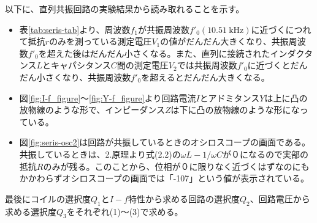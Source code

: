 \documentclass[12pt,a4paper]{jsarticle}
\numberwithin{equation}{section}
\numberwithin{figure}{section}
\numberwithin{table}{section}
\begin{document}
      以下に、直列共振回路の実験結果から読み取れることを示す。
      \begin{itemize}
        \item 表\ref{tab:seris-tab}より、周波数$f_1$が共振周波数$f'_0$$(\SI{10.51}{\kilo\hertz})$に近づくにつれて抵抗$r$のみを測っている測定電圧$V_1$の値がだんだん大きくなり、共振周波数$f'_0$を超えた後はだんだん小さくなる。また、直列に接続されたインダクタンス$L$とキャパシタンス$C$間の測定電圧$V_2$では共振周波数$f'_0$に近づくとだんだん小さくなり、共振周波数$f'_0$を超えるとだんだん大きくなる。
        \item 図\ref{fig:I-f_figure}～\ref{fig:Y-f_figure}より回路電流$I$とアドミタンス$Y$は上に凸の放物線のような形で、インピーダンス$Z$は下に凸の放物線のような形になっている。
        \item 図\ref{fig:seris-osc2}は回路が共振しているときのオシロスコープの画面である。共振しているときは、2.原理より式(2.2)の$\omega L-1 / \omega C$が０になるので実部の抵抗$R$のみが残る。このことから、位相が０に限りなく近づくはずなのにもかかわらずオシロスコープの画面では「-107」という値が表示されている。
      \end{itemize}

      最後にコイルの選択度$Q_1$と$I-f$特性から求める回路の選択度$Q_2$、回路電圧から求める選択度$Q_3$をそれぞれ(1)～(3)で求める。\\
\end{document}
